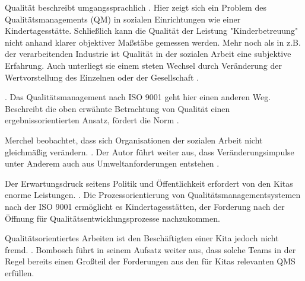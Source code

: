 Qualität beschreibt umgangssprachlich  \citep[][8]{studi14}.
Hier zeigt sich ein Problem des Qualitätsmanagements (QM) in sozialen Einrichtungen wie einer Kindertagesstätte. Schließlich kann die Qualität der Leistung "{}Kinderbetreuung"{} nicht anhand klarer objektiver Maßstäbe gemessen werden. Mehr noch als in z.B. der verarbeitenden Industrie ist Qualität in der sozialen Arbeit eine subjektive Erfahrung. Auch unterliegt sie einem steten Wechsel durch Veränderung der Wertvorstellung des Einzelnen oder der Gesellschaft \citep[vgl.][9]{studi14}.

 \citep[][8]{ISO9001}. Das Qualitätsmanagement nach ISO 9001 geht hier einen anderen Weg. Beschreibt die oben erwähnte Betrachtung von Qualität einen ergebnissorientierten Ansatz, fördert die Norm  \citep[][10]{ISO9001}.

Merchel beobachtet, dass sich Organisationen der sozialen Arbeit nicht gleichmäßig verändern.  \citep[][12]{Merchel2005}. Der Autor führt weiter aus, dass Veränderungsimpulse unter Anderem auch aus Umweltanforderungen entstehen \citep[vgl.][13]{Merchel2005}.

Der  Erwartungsdruck seitens Politik und Öffentlichkeit erfordert von den Kitas enorme Leistungen.  \citep[][11]{KitaMana}.
Die Prozessorientierung von Qualitätsmanagementsystemen nach der ISO 9001 ermöglicht es Kindertagesstätten, der Forderung nach der Öffnung für Qualitätsentwicklungsprozesse \citep[vgl.][26]{KitaMana} nachzukommen.

Qualitätsorientiertes Arbeiten ist den Beschäftigten einer Kita jedoch nicht fremd.  \citep[][197]{KitaMana}. Bombosch führt in seinem Aufsatz weiter aus, dass solche Teams in der Regel bereits einen Großteil der Forderungen aus den für Kitas relevanten QMS erfüllen.

